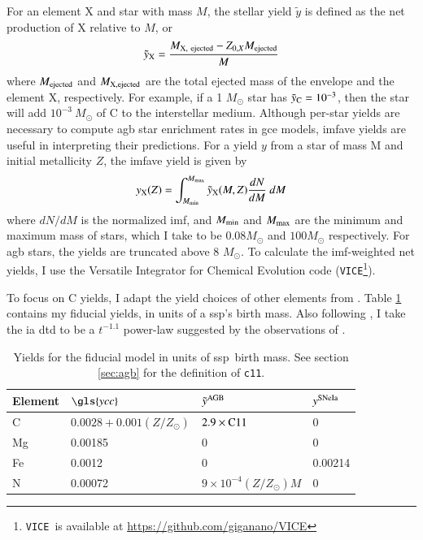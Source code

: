 \documentclass[12pt,oneside,letterpaper]{report}
\newcommand{\agb}{\gls{agb}}
\newcommand{\ia}{\gls{ia}}
\newcommand{\ssp}{\gls{ssp}}
\newcommand{\imf}{\gls{imf}}
\newcommand{\gce}{\gls{gce}}
\newcommand{\cxi}{\texttt{\gls{c11}}}
\newcommand{\Ycc}{\gls{ycc}}
\newcommand{\sun}{\odot}
\newcommand{\VICE}{\texttt{VICE}}
\begin{document}
For an element X and star with mass $M$, the stellar yield $\tilde{y}$ is defined as the net production of X relative to $M$, or
\begin{equation}
    \tilde{y}_{\rm X} = \frac{M_{\rm X,\ ejected} - Z_{0, X} M_{\rm ejected}}{M}   
\end{equation}
where $M_{\rm ejected}$ and $M_{\rm X, ejected}$  are the total ejected mass of the envelope and the element X, respectively. For example, if a 1 $M_\odot$ star has $\tilde{y}_{\rm C} = 10^{-3}$, then the star will add $10^{-3}\ M_\odot$ of C to the interstellar medium. 
Although per-star yields are necessary to compute \agb{} star enrichment rates in \gce{}  models, \gls{imfave} yields are useful in interpreting their predictions. For a yield $y$ from a star of mass M and initial metallicity $Z$, the \gls{imfave} yield is given by 
\begin{equation} \label{eq:imf-yield}
    y_{\rm X}(Z) = 
    \int_{M_{\rm min}}^{M_{\rm max}} 
    \tilde{y}_{\rm X}(M, Z)
    \frac{dN}{dM}  \ dM
\end{equation}
where ${dN}/{dM}$ is the normalized \imf, and $M_{\rm min}$ and $M_{\rm max}$ are the minimum and maximum mass of stars, which I take to be $0.08 M_{\sun}$ and $100 M_{\sun}$ respectively. For \agb{} stars, the yields are truncated above 8 $M_{\odot}$. 
To calculate the \imf-weighted net yields, I use the Versatile Integrator for Chemical Evolution code (\VICE\footnote{\VICE~is available at \url{https://github.com/giganano/VICE}}).

To focus on C yields, I adapt the yield choices of other elements from \citet{james+21, james+23}.
Table \ref{tab:fiducial_mod} contains my fiducial yields, in units of a \ssp's birth mass.
Also following \citet{james+21, james+23}, I take the \ia{} \gls{dtd} to be a
$t^{-1.1}$ power-law suggested by the observations of \citet{maoz+12}.


\begin{table}
	\centering
    \caption[Fiducial Model]{Yields for the fiducial model in units of \ssp~birth mass. See section \ref{sec:agb} for the definition of \cxi.}
	\label{tab:fiducial_mod}

	\begin{tabular}{l l l l}
		\toprule
        Element & $\Ycc$ & $\tilde{y}^{\rm AGB}$ & $y^{\rm SNe Ia}$ \\
		\midrule
        C & $0.0028 + 0.001(Z/Z_\odot)$ & $2.9\times{\rm C11}$ &  0 \\
        Mg & 0.00185 & 0 & 0 \\
        Fe & 0.0012 & 0 & 0.00214 \\
        N & 0.00072 & $9\times10^{-4}(Z/Z_\odot)M$ & 0\\
		\bottomrule
	\end{tabular}
\end{table}
\end{document}
